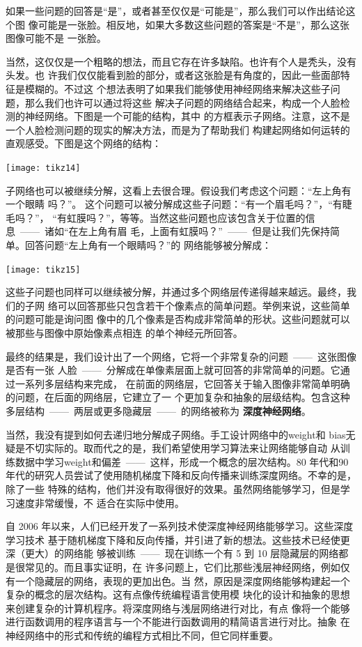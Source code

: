 如果一些问题的回答是“是”，或者甚至仅仅是“可能是”，那么我们可以作出结论这个图
像可能是一张脸。相反地，如果大多数这些问题的答案是“不是”，那么这张图像可能不是
一张脸。

当然，这仅仅是一个粗略的想法，而且它存在许多缺陷。也许有个人是秃头，没有头发。也
许我们仅仅能看到脸的部分，或者这张脸是有角度的，因此一些面部特征是模糊的。不过这
个想法表明了如果我们能够使用神经网络来解决这些子问题，那么我们也许可以通过将这些
解决子问题的网络结合起来，构成一个人脸检测的神经网络。下图是一个可能的结构，其中
的方框表示子网络。注意，这不是一个人脸检测问题的现实的解决方法，而是为了帮助我们
构建起网络如何运转的直观感受。下图是这个网络的结构：

\begin{center}
  \texttt{[image: tikz14]}
\end{center}

子网络也可以被继续分解，这看上去很合理。假设我们考虑这个问题：“左上角有一个眼睛
吗？”。 这个问题可以被分解成这些子问题：“有一个眉毛吗？”，“有睫毛吗？”，
“有虹膜吗？”，等等。当然这些问题也应该包含关于位置的信息~——~诸如“在左上角有眉
毛，上面有虹膜吗？”~——~但是让我们先保持简单。回答问题“左上角有一个眼睛吗？”的
网络能够被分解成：

\begin{center}
  \texttt{[image: tikz15]}
\end{center}

这些子问题也同样可以继续被分解，并通过多个网络层传递得越来越远。最终，我们的子网
络可以回答那些只包含若干个像素点的简单问题。举例来说，这些简单的问题可能是询问图
像中的几个像素是否构成非常简单的形状。这些问题就可以被那些与图像中原始像素点相连
的单个神经元所回答。

最终的结果是，我们设计出了一个网络，它将一个非常复杂的问题~——~这张图像是否有一张
人脸~——~分解成在单像素层面上就可回答的非常简单的问题。它通过一系列多层结构来完成，
在前面的网络层，它回答关于输入图像非常简单明确的问题，在后面的网络层，它建立了一
个更加复杂和抽象的层级结构。包含这种多层结构~——~两层或更多隐藏层~——~的网络被称为
\textbf{深度神经网络}。

当然，我没有提到如何去递归地分解成子网络。手工设计网络中的\gls*{weight}和%
\gls*{bias}无疑是不切实际的。取而代之的是，我们希望使用学习算法来让网络能够自动
从训练数据中学习\gls*{weight}和偏差~——~这样，形成一个概念的层次结构。80 年代和90
年代的研究人员尝试了使用随机梯度下降和反向传播来训练深度网络。不幸的是，除了一些
特殊的结构，他们并没有取得很好的效果。虽然网络能够学习，但是学习速度非常缓慢，不
适合在实际中使用。

自 2006 年以来，人们已经开发了一系列技术使深度神经网络能够学习。这些深度学习技术
基于随机梯度下降和反向传播，并引进了新的想法。这些技术已经使更深（更大）的网络能
够被训练~——~现在训练一个有 5 到 10 层隐藏层的网络都是很常见的。而且事实证明，在
许多问题上，它们比那些浅层神经网络，例如仅有一个隐藏层的网络，表现的更加出色。当
然，原因是深度网络能够构建起一个复杂的概念的层次结构。这有点像传统编程语言使用模
块化的设计和抽象的思想来创建复杂的计算机程序。将深度网络与浅层网络进行对比，有点
像将一个能够进行函数调用的程序语言与一个不能进行函数调用的精简语言进行对比。抽象
在神经网络中的形式和传统的编程方式相比不同，但它同样重要。
